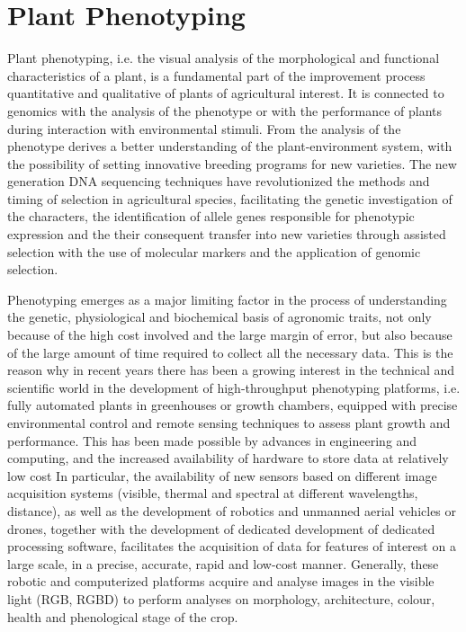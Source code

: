 


\section{Plant Phenotyping} %
Plant phenotyping, i.e. the visual analysis of the morphological and functional characteristics of a plant, is a fundamental part of the improvement process
quantitative and qualitative of plants of agricultural interest. It is connected to genomics with the analysis of the phenotype or with the performance of plants during
interaction with environmental stimuli. From the analysis of the phenotype derives a better understanding of the plant-environment system, with the possibility of setting
innovative breeding programs for new varieties. The new generation DNA sequencing techniques have revolutionized the methods and timing of selection in agricultural
species, facilitating the genetic investigation of the characters, the identification of allele genes responsible for phenotypic expression and the
their consequent transfer into new varieties through assisted selection with the use of molecular markers and the application of genomic selection.

Phenotyping emerges as a major limiting factor in the process of understanding the genetic, physiological and biochemical basis of agronomic traits, not only because of
the high cost involved and the large margin of error, but also because of the large amount of time required to collect all the necessary data. This is the reason why
in recent years there has been a growing interest in the technical and scientific world in the development of high-throughput phenotyping platforms, i.e. fully
automated plants in greenhouses or growth chambers, equipped with precise environmental control and remote sensing techniques to assess plant growth and performance.
This has been made possible by advances in engineering and computing, and the increased availability of hardware to store data at relatively low cost
In particular, the availability of new sensors based on different image acquisition systems (visible, thermal and spectral at different wavelengths, distance),
as well as the development of robotics and unmanned aerial vehicles or drones, together with the development of dedicated development of dedicated processing software,
facilitates the acquisition of data for features of interest on a large scale, in a precise, accurate, rapid and low-cost manner. Generally, these robotic and computerized
platforms acquire and analyse images in the visible light (RGB, RGBD) to perform analyses on morphology, architecture, colour, health and phenological stage of the crop.


